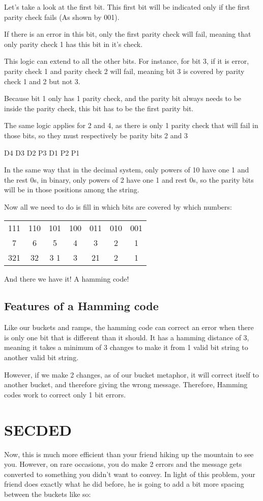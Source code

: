 \documentclass{article}
\begin{document}
   Let's take a look at the first bit. This first bit will be indicated only if the first parity check fails (As shown by 001). 

  If there is an error in this bit, only the first parity check will fail, meaning that only parity check 1 has this bit in it's check.

  This logic can extend to all the other bits. For instance, for bit 3, if it is error, parity check 1 and parity check 2 will fail, meaning bit 3 is covered by parity check 1 and 2 but not 3.

  Because bit 1 only has 1 parity check, and the parity bit always needs to be inside the parity check, this bit has to be the first parity bit.

  The same logic applies for 2 and 4, as there is only 1 parity check that will fail in those bits, so they must respectively be parity bits 2 and 3

  D4 D3 D2 P3 D1 P2 P1

  In the same way that in the decimal system, only powers of 10 have one 1 and the rest 0s, in binary, only powers of 2 have one 1 and rest 0s, so the parity bits will be in those positions among the string.

  Now all we need to do is fill in which bits are covered by which numbers:
  
  \begin{tabular}{|c|c|c|c|c|c|c|}
    111&110&101&100&011&010&001 \\
    7 & 6 & 5 & 4 & 3 & 2 & 1 \\
    321&32 &3 1&3  & 21& 2 &  1
  \end{tabular}

  And there we have it! A hamming code!

  \subsection*{Features of a Hamming code}
  Like our buckets and ramps, the hamming code can correct an error when there is only one bit that is different than it should. It has a hamming distance of 3, meaning it takes a minimum of 3 changes to make it from 1 valid bit string to another valid bit string.

  However, if we make 2 changes, as of our bucket metaphor, it will correct itself to another bucket, and therefore giving the wrong message. Therefore, Hamming codes work to correct only 1 bit errors.

  \section*{SECDED}
  Now, this is much more efficient than  your friend hiking up the mountain to see you. However, on rare occasions, you do make 2 errors and the message gets converted to something you didn't want to convey. In light of this problem, your friend does exactly what he did before, he is going to add a bit more spacing between the buckets like so:
\end{document}
